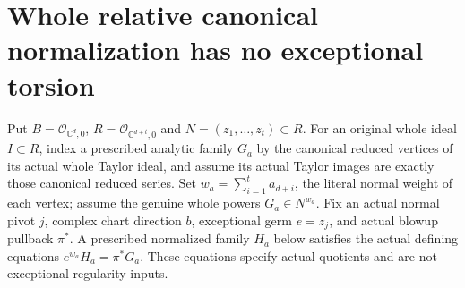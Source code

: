 \section{Whole relative canonical normalization has no exceptional torsion}

Put $B=\mathcal O_{\mathbb C^d,0}$, $R=\mathcal O_{\mathbb C^{d+t},0}$
and $N=(z_1,\ldots,z_t)\subset R$. For an original whole ideal $I\subset R$,
index a prescribed analytic family $G_a$ by the canonical reduced vertices of
its actual whole Taylor ideal, and assume its actual Taylor images are exactly
those canonical reduced series. Set $w_a=\sum_{i=1}^t a_{d+i}$, the literal
normal weight of each vertex; assume the genuine whole powers $G_a\in N^{w_a}$.
Fix an actual normal pivot $j$, complex chart direction $b$, exceptional germ
$e=z_j$, and actual blowup pullback $\pi^*$. A prescribed normalized family
$H_a$ below satisfies the actual defining equations $e^{w_a}H_a=\pi^*G_a$.
These equations specify actual quotients and are not exceptional-regularity inputs.


